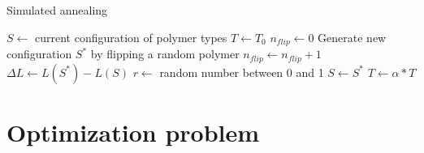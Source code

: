 \documentclass[bachelor,       %
               twoside,        %
               BCOR10mm,       %
               ngerman, english %
               ]{GAUBM}
\begin{document}
\begin{algorithm}[H]
\caption{Simulated annealing}\label{alg:sa}
\begin{algorithmic}
\State $S \gets$ current configuration of polymer types
\State $T \gets T_0$
    \State $n_{flip} \gets 0$
        \State Generate new configuration $S^*$ by flipping a random polymer
        \State $n_{flip}\gets n_{flip}+1$
        \State $\Delta L\gets L(S^*)-L(S)$
        \State $r\gets$ random number between 0 and 1
            \State $S\gets S^*$
        \EndIf
    \EndWhile
\State $T\gets\alpha*T$ 
\EndWhile
\end{algorithmic}
\end{algorithm}

\chapter{Optimization problem}
\end{document}
